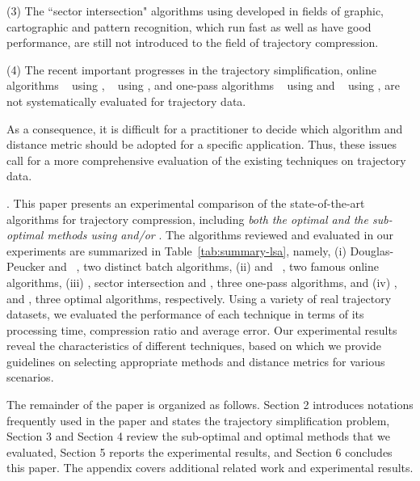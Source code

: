 \ni (3) The ``sector intersection" algorithms using \ped \cite{Williams:Longest, Sklansky:Cone, Dunham:Cone, Zhao:Sleeve} developed in fields of graphic, cartographic and pattern recognition, which run fast as well as have good performance, are still not introduced to the field of trajectory compression.

\ni (4) The recent important progresses in the trajectory simplification, \ie online algorithms \squishe~\cite{Muckell:Compression} using \sed, \bqsa~\cite{Liu:BQS} using \ped, and one-pass algorithms \operb~\cite{Lin:Operb} using \ped and \cised~\cite{Lin:Cised} using \sed, are not systematically evaluated for trajectory data. 




As a consequence, it is difficult for a practitioner to decide which algorithm and distance metric should be adopted for a specific application. Thus, these issues call for a more comprehensive evaluation of the existing \lsa techniques on trajectory data.

\stitle{\textcolor[rgb]{0.00,0.07,1.00}{Contributions \& Roadmap}}.
This paper presents an experimental comparison of the state-of-the-art \lsa algorithms for trajectory compression, including \emph{both the optimal and the sub-optimal methods using \ped and/or \sed}. 
The algorithms reviewed and evaluated in our experiments are summarized in Table~\ref{tab:summary-lsa}, namely,
(i) Douglas-Peucker\cite{Douglas:Peucker,Meratnia:Spatiotemporal} and \pavlidis~\cite{Pavlidis:Segment}, two distinct batch \lsa algorithms,
(ii) \bqsa\cite{Liu:BQS} and \squishe~\cite{Muckell:SQUISH}, two famous online \lsa algorithms,
(iii) \operb\cite{Lin:Operb}, sector intersection \cite{Williams:Longest,Sklansky:Cone,Dunham:Cone, Zhao:Sleeve} and \cised \cite{Lin:Cised}, three one-pass \lsa algorithms, and
(iv) \nopt \cite{Imai:Optimal}, \oped\cite{Chan:Optimal} and \osed, three optimal \lsa algorithms, respectively.
%
%
Using a variety of real trajectory datasets, we evaluated the performance of each technique in terms of its processing time, compression ratio and average error.
Our experimental results reveal the characteristics of different techniques, based on which we provide guidelines on selecting appropriate methods and distance metrics for various scenarios.

The remainder of the paper is organized as follows.
Section 2 introduces notations frequently used in the paper and states the trajectory simplification problem,
Section 3 and Section 4 review the sub-optimal and optimal \lsa methods that we evaluated,
Section 5 reports the experimental results, and
Section 6 concludes this paper.
The appendix covers additional related work and experimental results.



